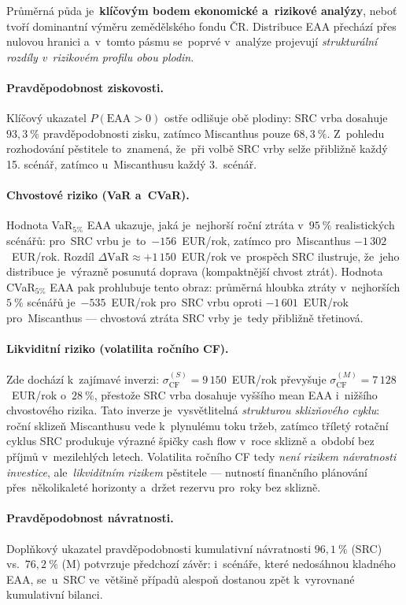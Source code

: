Průměrná půda je~\textbf{klíčovým bodem ekonomické a~rizikové analýzy},
neboť tvoří dominantní výměru zemědělského fondu ČR. Distribuce EAA
přechází přes nulovou hranici a~v~tomto pásmu se~poprvé v~analýze
projevují \emph{strukturální rozdíly v~rizikovém profilu obou plodin}.

\paragraph{Pravděpodobnost ziskovosti.}
Klíčový ukazatel $P(\mathrm{EAA}>0)$ ostře odlišuje obě plodiny:
SRC vrba dosahuje $93{,}3~\%$ pravděpodobnosti zisku, zatímco Miscanthus
pouze $68{,}3~\%$. Z~pohledu rozhodování pěstitele to~znamená, že~při
volbě SRC vrby selže přibližně každý 15. scénář, zatímco
u~Miscanthusu každý 3.~scénář.

\paragraph{Chvostové riziko (VaR a~CVaR).}
Hodnota VaR$_{5\%}$ EAA ukazuje, jaká je~nejhorší roční ztráta v~$95~\%$
realistických scénářů: pro~SRC vrbu je~to~$-156$~EUR/rok, zatímco
pro~Miscanthus $-1\,302$~EUR/rok. Rozdíl
$\Delta \mathrm{VaR} \approx +1\,150$~EUR/rok ve~prospěch SRC ilustruje,
že~jeho distribuce je~výrazně posunutá doprava (kompaktnější chvost ztrát).
Hodnota CVaR$_{5\%}$ EAA pak prohlubuje tento obraz: průměrná hloubka
ztráty v~nejhorších $5~\%$ scénářů je~$-535$~EUR/rok pro~SRC vrbu
oproti $-1\,601$~EUR/rok pro~Miscanthus --- chvostová ztráta SRC vrby
je~tedy přibližně třetinová.

\paragraph{Likviditní riziko (volatilita ročního CF).}
Zde dochází k~zajímavé inverzi: $\sigma_{\mathrm{CF}}^{(S)} = 9\,150$~EUR/rok
převyšuje $\sigma_{\mathrm{CF}}^{(M)} = 7\,128$~EUR/rok o~$28~\%$,
přestože SRC vrba dosahuje vyššího mean EAA i~nižšího chvostového rizika.
Tato inverze je~vysvětlitelná \emph{strukturou sklizňového cyklu}:
roční sklizeň Miscanthusu vede k~plynulému toku tržeb, zatímco tříletý
rotační cyklus SRC produkuje výrazné špičky cash flow v~roce sklizně
a~období bez příjmů v~mezilehlých letech. Volatilita ročního CF tedy
\emph{není rizikem návratnosti investice}, ale~\emph{likviditním rizikem}
pěstitele --- nutností finančního plánování přes~několikaleté horizonty
a~držet rezervu pro~roky bez sklizně.

\paragraph{Pravděpodobnost návratnosti.}
Doplňkový ukazatel pravděpodobnosti kumulativní návratnosti $96{,}1~\%$
(SRC) vs.~$76{,}2~\%$ (M) potvrzuje předchozí závěr: i~scénáře, které
nedosáhnou kladného EAA, se~u~SRC ve~většině případů alespoň dostanou
zpět k~vyrovnané kumulativní bilanci.

